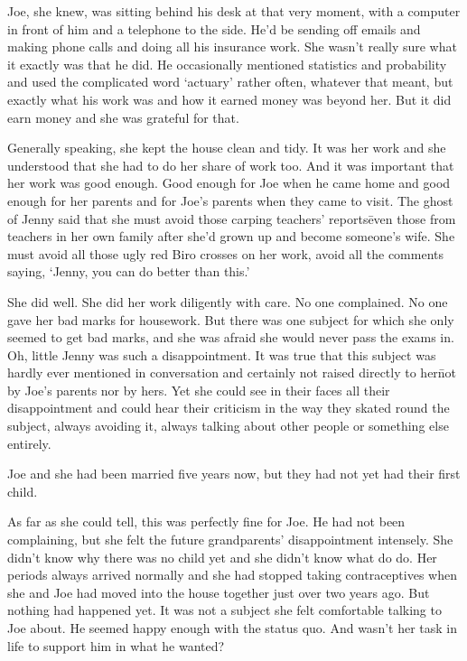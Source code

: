 Joe, she knew, was sitting behind his desk at that very moment, 
with a computer in front of him and a telephone to the side. He'd 
be sending off emails and making phone calls and doing all his 
insurance work. She wasn't really sure what it exactly was that he 
did. He occasionally mentioned statistics and probability and used 
the complicated word `actuary' rather often, whatever that meant, 
but exactly what his work was and how it earned money was beyond 
her. But it did earn money and she was grateful for that.

Generally speaking, she kept the house clean and tidy. It was her 
work and she understood that she had to do her share of work too. 
And it was important that her work was good enough. Good enough 
for Joe when he came home and good enough for her parents and for 
Joe's parents when they came to visit. The ghost of Jenny said 
that she must avoid those carping teachers' reports\=even those 
from teachers in her own family after she'd grown up and become 
someone's wife. She must avoid all those ugly red Biro crosses on 
her work, avoid all the comments saying, `Jenny, you can do better 
than this.'

She did well. She did her work diligently with care. No one 
complained. No one gave her bad marks for housework. But there was 
one subject for which she only seemed to get bad marks, and she was 
afraid she would never pass the exams in. Oh, little Jenny was 
such a disappointment. It was true that this subject was hardly 
ever mentioned in conversation and certainly not raised directly to 
her\=not by Joe's parents nor by hers. Yet she could see in their 
faces all their disappointment and could hear their criticism in 
the way they skated round the subject, always avoiding it, always 
talking about other people or something else entirely.

Joe and she had been married five years now, but they had not yet 
had their first child.

As far as she could tell, this was perfectly fine for Joe. He had not been
complaining, but she felt the future grandparents' disappointment 
intensely. She didn't know why there was no child yet and she 
didn't know what do do. Her periods always arrived normally and she 
had stopped taking contraceptives when she and Joe had moved into 
the house together just over two years ago. But nothing had 
happened yet. It was not a subject she felt comfortable talking to 
Joe about. He seemed happy enough with the status quo. And wasn't 
her task in life to support him in what he wanted?

